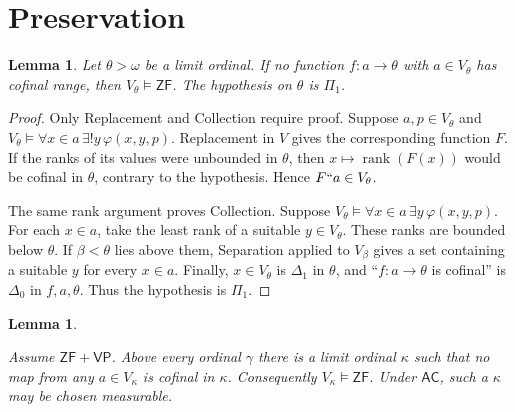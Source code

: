 \documentclass[11pt,a4paper]{amsart}
\newcommand{\VP}{\mathsf{VP}}
\newcommand{\AC}{\mathsf{AC}}
\newcommand{\ZF}{\mathsf{ZF}}
\newcommand{\rank}{\operatorname{rank}}
\theoremstyle{plain}
\newtheorem{lemma}[theorem]{Lemma}
\theoremstyle{definition}
\theoremstyle{remark}
\begin{document}
\section{Preservation}

\begin{lemma}\label{lem:ZF-rank-criterion}
Let $\theta>\omega$ be a limit ordinal.  If no function $f:a\to\theta$ with $a\in V_\theta$ has cofinal range, then $V_\theta\models\ZF$.  The hypothesis on $\theta$ is $\Pi_1$.
\end{lemma}

\begin{proof}
Only Replacement and Collection require proof.  Suppose $a,p\in V_\theta$ and $V_\theta\models\forall x\in a\,\exists!y\,\varphi(x,y,p)$.  Replacement in $V$ gives the corresponding function $F$.  If the ranks of its values were unbounded in $\theta$, then $x\mapsto\rank(F(x))$ would be cofinal in $\theta$, contrary to the hypothesis.  Hence $F``a\in V_\theta$.

The same rank argument proves Collection.  Suppose $V_\theta\models\forall x\in a\,\exists y\,\varphi(x,y,p)$.  For each $x\in a$, take the least rank of a suitable $y\in V_\theta$.  These ranks are bounded below $\theta$.  If $\beta<\theta$ lies above them, Separation applied to $V_\beta$ gives a set containing a suitable $y$ for every $x\in a$.  Finally, $x\in V_\theta$ is $\Delta_1$ in $\theta$, and ``$f:a\to\theta$ is cofinal'' is $\Delta_0$ in $f,a,\theta$.  Thus the hypothesis is $\Pi_1$.
\end{proof}

\begin{lemma}\label{lem:ZF-ranks}

Assume $\ZF+\VP$.  Above every ordinal $\gamma$ there is a limit ordinal $\kappa$ such that no map from any $a\in V_\kappa$ is cofinal in $\kappa$.  Consequently $V_\kappa\models\ZF$.  Under $\AC$, such a $\kappa$ may be chosen measurable.
\end{lemma}
\end{document}
